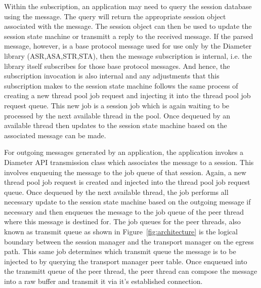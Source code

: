 \documentclass{article}
\begin{document}
Within the subscription, an application may need to query the session
database using the message.  The query will return the appropriate
session object associated with the message. The session object can then
be used to update the session state machine or transmitt a reply to the
received message.  If the parsed message, however, is a base protocol
message used for use only by the Diameter library (ASR,ASA,STR,STA),
then the message subscription is internal, i.e. the library itself
subscribes for those base protocol messages. And hence, the subscription
invocation is also internal and any adjustments that this subscription
makes to the session state machine follows the same process of creating
a new thread pool job request and injecting it into the thread pool job
request queue. This new job is a session job which is again waiting to
be processed by the next available thread in the pool. Once dequeued by
an available thread then updates to the session state machine based on
the associated message can be made.

For outgoing messages generated by an application, the application
invokes a Diameter API transmission class which associates the message
to a session. This involves enqueuing the message to the job queue of
that session. Again, a new thread pool job request is created and
injected into the thread pool job request queue. Once dequeued by the
next available thread, the job performs all necessary update to the
session state machine based on the outgoing message if necessary and
then enqueues the message to the job queue of the peer thread where this
message is destined for. The job queues for the peer threads, also known
as transmit queue as shown in Figure~\ref{fig:architecture} is the
logical boundary between the session manager and the transport manager
on the egress path. This same job determines which transmit queue the
message is to be injected to by querying the transport manager peer
table. Once enqueued into the transmitt queue of the peer thread, the
peer thread can compose the message into a raw buffer and transmit it
via it's established connection.
\end{document}
